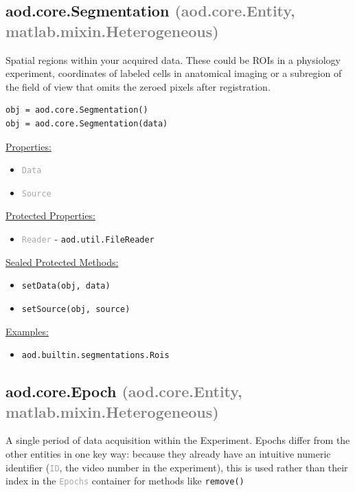 \documentclass[10pt]{exam}
\newcommand\myparent[1]{\textcolor{gray}{(#1)}}
\newcommand\aodclass[1]{\textcolor{codeblue}{\texttt{#1}}}
\newcommand\aodprop[1]{\textcolor{darkgray}{\texttt{#1}}}
\newcommand\aodfcn[1]{\textcolor{darkteal}{\texttt{#1}}}
\newcommand\docheader[1]{\vspace{0.6ex}\noindent\underline{#1}\vspace{0.15ex}}
\begin{document}
	\subsection{aod.core.Segmentation \myparent{aod.core.Entity, matlab.mixin.Heterogeneous}} 
		\noindent Spatial regions within your acquired data. These could be ROIs in a physiology experiment, coordinates of labeled cells in anatomical imaging or a subregion of the field of view that omits the zeroed pixels after registration.  
	
		\begin{lstlisting}[style=matlab-editor, basicstyle=\mlttfamily\footnotesize]
obj = aod.core.Segmentation()		
obj = aod.core.Segmentation(data)
		\end{lstlisting}
		\docheader{Properties:}
		\begin{itemize}
			\item \aodprop{Data}
			\item \aodprop{Source}
		\end{itemize}
		\docheader{Protected Properties:}
		\begin{itemize}
			\item \aodprop{Reader} - \aodclass{aod.util.FileReader}
		\end{itemize}
		\docheader{Sealed Protected Methods:}
		\begin{itemize}
			\item \aodfcn{setData(obj, data)}
			\item \aodfcn{setSource(obj, source)}
		\end{itemize}
		\docheader{Examples:}
		\begin{itemize}
			\item \aodclass{aod.builtin.segmentations.Rois}
		\end{itemize}

	\subsection{aod.core.Epoch \myparent{aod.core.Entity, matlab.mixin.Heterogeneous}}
		\noindent A single period of data acquisition within the Experiment. Epochs differ from the other entities in one key way: because they already have an intuitive numeric identifier (\aodprop{ID}, the video number in the experiment), this is used rather than their index in the \aodprop{Epochs} container for methods like \aodfcn{remove()} 
	
\end{document}
